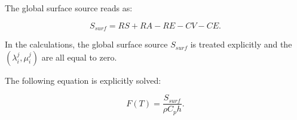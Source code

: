 The global surface source reads as:

\begin{equation}
  S_{surf} = RS + RA - RE - CV - CE.
\end{equation}


In the calculations, the global surface source $S_{surf}$ is treated explicitly
and the $(\lambda_i^j, \mu_i^j)$ are all equal to zero.

The following equation is explicitly solved:

\begin{equation}
  F(T) = \frac{S_{surf}}{\rho C_p h}.
\end{equation}
